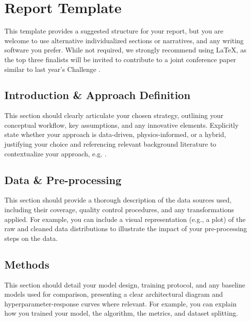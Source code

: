 \documentclass[11pt,a4paper]{storm-ai_report}
\begin{document}
\newpage

\section{Report Template}
This template provides a suggested structure for your report, but you are welcome to use alternative individualized sections or narratives, and any writing software you prefer. While not required, we strongly recommend using LaTeX, as the top three finalists will be invited to contribute to a joint conference paper similar to last year's Challenge \cite{challenge2024}. 

\subsection{Introduction \& Approach Definition}
This section should clearly articulate your chosen strategy, outlining your conceptual workflow, key assumptions, and any innovative elements. Explicitly state whether your approach is data-driven, physics-informed, or a hybrid, justifying your choice and referencing relevant background literature to contextualize your approach, e.g. \cite{Briden2023}. 

\subsection{Data \& Pre-processing}
This section should provide a thorough description of the data sources used, including their coverage, quality control procedures, and any transformations applied. For example, you can include a visual representation (e.g., a plot) of the raw and cleaned data distributions to illustrate the impact of your pre-processing steps on the data.

\subsection{Methods}
This section should detail your model design, training protocol, and any baseline models used for comparison, presenting a clear architectural diagram and hyperparameter-response curves where relevant. For example, you can explain how you trained your model, the algorithm, the metrics, and dataset splitting.
\end{document}
